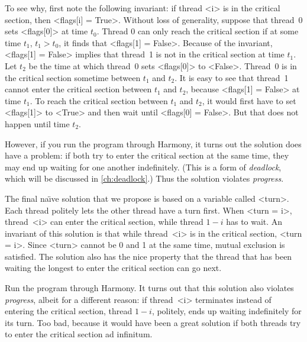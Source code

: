 \documentclass{report}
\begin{document}
To see why, first note the following invariant: if thread <{i}> is in the
critical section, then <{flags[i] = True}>.
Without loss of generality,
suppose that thread~0 sets <{flags[0]}> at time $t_0$.
Thread 0 can only reach the critical section if at some time $t_1$,
$t_1 > t_0$, it finds that <{flags[1] = False}>.
Because of the invariant, <{flags[1] = False}> implies that
thread~1 is not in the critical section at time $t_1$.
Let $t_2$ be the time at which thread~0 sets <{flags[0]}>
to <{False}>.  Thread~0 is in the critical section sometime
between $t_1$ and $t_2$.
It is easy to see that thread~1 cannot enter the critical section
between $t_1$ and $t_2$, because <{flags[1] = False}> at
time $t_1$.  To reach the critical section between $t_1$ and $t_2$,
it would first have to set <{flags[1]}> to <{True}> and
then wait until <{flags[0] = False}>.  But that does not happen
until time $t_2$.

However, if you run the program through Harmony,
it turns out the solution
does have a problem: if both try to enter the critical section at the same
time, they may end up waiting for one another indefinitely.
(This is a form of \emph{deadlock}, which will be discussed in
\autoref{ch:deadlock}.)
Thus the
solution violates \emph{progress}.

The final na\"{\i}ve solution that we propose
is based on a variable called <{turn}>.
Each thread politely lets the other thread have a turn first.
When <{turn = i}>, thread~<{i}> can
enter the critical section, while thread $1-i$ has to wait.
An invariant of this solution is that while thread~<{i}> is in the critical
section, <{turn = i}>.
Since <{turn}> cannot be 0 and 1 at
the same time, mutual exclusion is satisfied.
The solution also has the nice property that the thread that has been waiting the
longest to enter the critical section can go next.

Run the program through Harmony.  It turns out that this solution also violates
\emph{progress}, albeit for a different reason:
if thread~<{i}> terminates instead of entering the critical section,
thread $1-i$, politely, ends up waiting indefinitely for its turn.
Too bad, because it would have been a great solution if both
threads try to enter the critical section ad infinitum.
\end{document}
